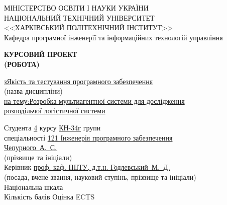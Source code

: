 {
\newcommand{\fillemptyline}{\uline{\hspace*{\fill}}}
\newcommand{\fillline}[2][]{\uline{#1\hspace*{\fill}#2\hspace*{\fill}\hphantom{#1}}}

\newcommand{\suline}[1]{\uline{\hspace{12pt}#1\hspace{12pt}}}
\newcommand{\undercaption}[1]{{\centering\footnotesize#1\\\noindent}}

\begin{titlepage}
	\begin{center}
		МІНІСТЕРСТВО ОСВІТИ І НАУКИ УКРАЇНИ \\
		НАЦІОНАЛЬНИЙ ТЕХНІЧНИЙ УНІВЕРСИТЕТ \\
		<<ХАРКІВСЬКИЙ ПОЛІТЕХНІЧНИЙ ІНСТИТУТ>> \\
		Кафедра програмної інженерії та інформаційних технологій управління
	\end{center}
	\vspace*{\fill}
	\begin{center}
		\MakeUppercase{\large\bfseries Курсовий проект} \\
		\MakeUppercase{\large\bfseries (робота)}
	\end{center}
	\noindent
	\fillline[з]{Якість та тестування програмного забезпечення} \\
	\undercaption{(назва дисципліни)}
	\fillline[на тему:]{Розробка мультиагентної системи для дослідження} \\
	\fillline{розподільчої логістичної системи}
	
	\vspace*{\fill}

	\begin{addmargin}[7cm]{0cm}
		\small
		Студента \suline{4} курсу \suline{КН-34г} групи \hspace*{\fill} \\
		спеціальності \fillline{121 Інженерія програмного забезпечення} \\ 
		\fillline{Чепурного~А.~С.} \\
		\undercaption{(прізвище та ініціали)}
		Керівник \fillline{проф. каф. ПІІТУ, д.т.н. Годлевський~М.~Д.} \\
		\undercaption{(посада, вчене звання, науковий ступінь, прізвище та ініціали)}
		Національна шкала \fillemptyline \\
		Кількість балів	\fillemptyline Оцінка ECTS \fillemptyline	
	\end{addmargin}


\end{titlepage}}
